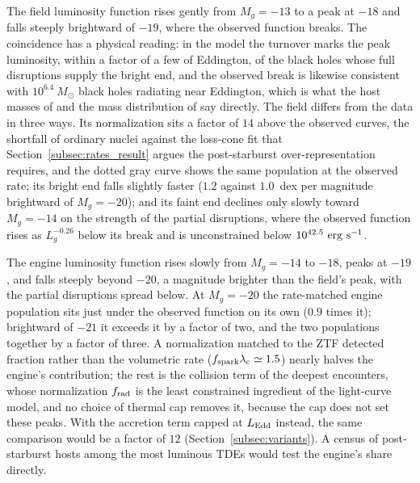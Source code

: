 \documentclass[twocolumn,pdftex]{aastex701}
\newcommand{\msun}{M_{\odot}\xspace}
\newcommand{\fspark}{f_{\rm spark}\xspace}
\newcommand{\lamc}{\lambda_{\rm c}\xspace}
\begin{document}
The field luminosity function rises gently from $M_g = -13$ to a peak at $-18$ and falls steeply brightward of $-19$, where the observed function breaks. The coincidence has a physical reading: in the model the turnover marks the peak luminosity, within a factor of a few of Eddington, of the black holes whose full disruptions supply the bright end, and the observed break is likewise consistent with $10^{6.4}~\msun$ black holes radiating near Eddington, which is what the host masses of \citet{Yao:2023a} and the mass distribution of \citet{Mummery:2025a} say directly. The field differs from the data in three ways. Its normalization sits a factor of $14$ above the observed curves, the shortfall of ordinary nuclei against the loss-cone fit that Section~\ref{subsec:rates_result} argues the post-starburst over-representation requires, and the dotted gray curve shows the same population at the observed rate; its bright end falls slightly faster ($1.2$ against $1.0$~dex per magnitude brightward of $M_g = -20$); and its faint end declines only slowly toward $M_g = -14$ on the strength of the partial disruptions, where the observed function rises as $L_g^{-0.26}$ below its break and is unconstrained below $10^{42.5}~{\rm erg~s^{-1}}$.

The engine luminosity function rises slowly from $M_g = -14$ to $-18$, peaks at $-19$, and falls steeply beyond $-20$, a magnitude brighter than the field's peak, with the partial disruptions spread below. At $M_g = -20$ the rate-matched engine population sits just under the observed function on its own ($0.9$ times it); brightward of $-21$ it exceeds it by a factor of two, and the two populations together by a factor of three. A normalization matched to the ZTF detected fraction rather than the volumetric rate ($\fspark \lamc \simeq 1.5$) nearly halves the engine's contribution; the rest is the collision term of the deepest encounters, whose normalization $f_{\rm rad}$ is the least constrained ingredient of the light-curve model, and no choice of thermal cap removes it, because the cap does not set these peaks. With the accretion term capped at $L_{\rm Edd}$ instead, the same comparison would be a factor of $12$ (Section~\ref{subsec:variants}). A census of post-starburst hosts among the most luminous TDEs would test the engine's share directly.
\end{document}
